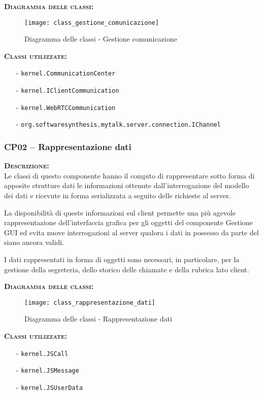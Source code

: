 \begin{description}
	\item{\scshape\bfseries Diagramma delle classi:}
  \begin{figure}[H]
    \centering
    \texttt{[image: class\_gestione\_comunicazione]}
    \caption{Diagramma delle classi - Gestione comunicazione}\label{fig:gestionecomunicazione}
  \end{figure}

	\item{\scshape\bfseries Classi utilizzate:} 
	\begin{itemize}[noitemsep,nolistsep]
		\item[-] \texttt{kernel.CommunicationCenter}
		\item[-] \texttt{kernel.IClientCommunication}
		\item[-] \texttt{kernel.WebRTCCommunication}
		\item[-] \texttt{org.softwaresynthesis.mytalk.server.connection.IChannel}
	\end{itemize}  
\end{description}

\subsubsection{CP02 -- Rappresentazione dati}
\begin{description}
  \item{\scshape\bfseries Descrizione:}\\
Le classi di questo componente hanno il compito di rappresentare sotto forma di apposite strutture dati le informazioni ottenute dall'interrogazione del modello dei dati e ricevute in forma serializzata a seguito delle richieste al server.

La disponibilità di queste informazioni sul client permette una più agevole rappresentazione dell'interfaccia grafica per gli oggetti del componente \textsf{Gestione GUI} ed evita nuove interrogazioni al server qualora i dati in possesso da parte del  siano ancora validi.

I dati rappresentati in forma di oggetti sono necessari, in particolare, per la gestione della segreteria, dello storico delle chiamate e della rubrica lato client.

  \item{\scshape\bfseries Diagramma delle classi:}\\
  \begin{figure}[H]
    \centering
    \texttt{[image: class\_rappresentazione\_dati]}
    \caption{Diagramma delle classi - Rappresentazione dati}\label{fig:rappresentazionedati}
  \end{figure}

	\item{\scshape\bfseries Classi utilizzate:} 
	\begin{itemize}[noitemsep,nolistsep]
		\item[-] \texttt{kernel.JSCall}
		\item[-] \texttt{kernel.JSMessage}
		\item[-] \texttt{kernel.JSUserData}
	\end{itemize}  
\end{description}

